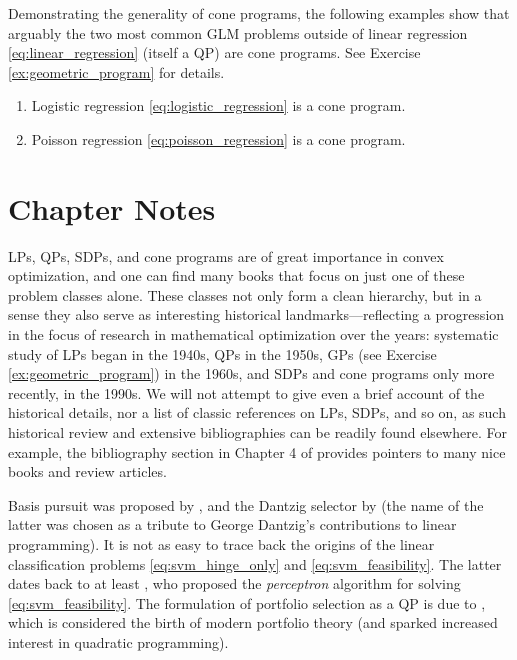 \begin{Example}
Demonstrating the generality of cone programs, the following examples show that
arguably the two most common GLM problems outside of linear regression
\eqref{eq:linear_regression} (itself a QP) are cone programs. See Exercise
\ref{ex:geometric_program} for details.     

\begin{enumerate}[label=\alph*., ref=\alph*]
\item {}
  Logistic regression \eqref{eq:logistic_regression} is a cone program. 

\item {}
  Poisson regression \eqref{eq:poisson_regression} is a cone program. 
\end{enumerate}
\end{Example}

\SkipTocEntry\section*{Chapter Notes}

LPs, QPs, SDPs, and cone programs are of great importance in convex
optimization, and one can find many books that focus on just one of these
problem classes alone. These classes not only form a clean hierarchy, but in a
sense they also serve as interesting historical landmarks---reflecting a
progression in the focus of research in mathematical optimization over the
years: systematic study of LPs began in the 1940s, QPs in the 1950s, GPs (see
Exercise \ref{ex:geometric_program}) in the 1960s, and SDPs and cone programs
only more recently, in the 1990s. We will not attempt to give even a brief
account of the historical details, nor a list of classic references on LPs,
SDPs, and so on, as such historical review and extensive bibliographies can be
readily found elsewhere. For example, the bibliography section in Chapter 4 of
\cite{boyd2004convex} provides pointers to many nice books and review articles. 

Basis pursuit was proposed by \cite{chen1998atomic}, and the Dantzig selector by
\cite{candes2007dantzig} (the name of the latter was chosen as a tribute to
George Dantzig's contributions to linear programming). It is not as easy to
trace back the origins of the linear classification problems
\eqref{eq:svm_hinge_only} and \eqref{eq:svm_feasibility}. The latter dates back
to at least \cite{rosenblatt1958perceptron}, who proposed the \emph{perceptron}
algorithm for solving \eqref{eq:svm_feasibility}. The formulation of portfolio
selection as a QP is due to \cite{markowitz1952portfolio}, which is considered
the birth of modern portfolio theory (and sparked increased interest in
quadratic programming).

